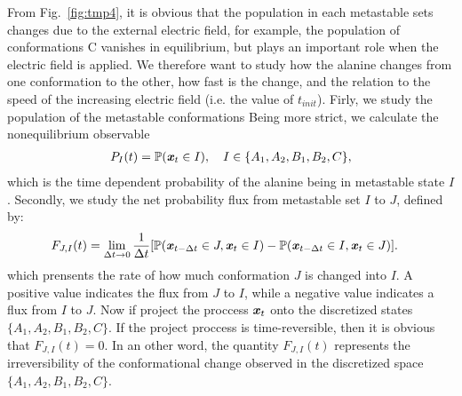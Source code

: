 \documentclass[aip,jcp,a4paper,preprint,onecolumn]{revtex4-1}
\newcommand{\vect}[1]{\textbf{\textit{#1}}}
\newcommand{\fwd}[0]{\textrm{fwd}}
\newcommand{\bwd}[0]{\textrm{bwd}}
\begin{document}
From Fig.~\ref{fig:tmp4}, it is obvious that the population in each
metastable sets changes due to the external electric field, for
example, the population of conformations C vanishes in equilibrium,
but plays an important role when the electric field is applied. We
therefore want to study how the alanine changes from one conformation
to the other, how fast is the change, and the relation to the speed of
the increasing electric field (i.e. the value of $t_{init}$). 
Firly, we study the population of the metastable conformations
Being more strict, we calculate the nonequilibrium observable
\begin{align}
  P_I(t) = \mathbb P (\vect x_t \in I), \quad  I \in \{A_1, A_2, B_1, B_2, C\},
\end{align}
which is the time dependent probability of the alanine being in metastable
state $I$.
Secondly,
we study the net probability flux from metastable set $I$ to $J$, defined by:
\begin{align}\label{eqn:tmp7}
  F_{J,I}(t) & =\lim_{\Delta t\rightarrow 0} \frac1{\Delta t} [\mathbb P( \vect x_{t-\Delta t} \in J, \vect x_t \in I) - \mathbb P( \vect x_{t-\Delta t} \in I, \vect x_t \in J)].
\end{align}
which prensents the rate of how much conformation $J$ is changed
into $I$. A positive value indicates the
flux from $J$ to $I$, while a negative value indicates a flux from $I$ to $J$.
Now if project the proccess $\vect x_t$ onto the discretized states $\{A_1, A_2, B_1, B_2, C\}$. If the
project proccess is time-reversible, then it is obvious that
$ F_{J,I}(t) = 0$. In an other word, the quantity $ F_{J,I}(t) $ represents
the irreversibility of the conformational change observed in the discretized space $\{A_1, A_2, B_1, B_2, C\}$.
\end{document}
